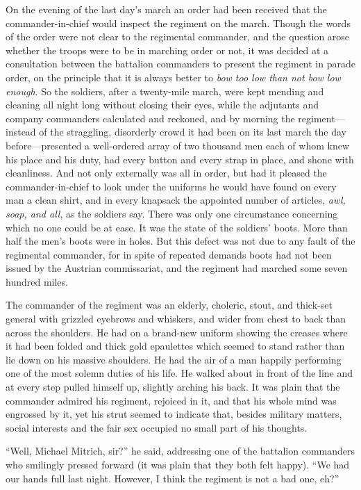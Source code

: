 On the evening of the last day's march an order had been received
that the commander-in-chief would inspect the regiment on the
march. Though the words of the order were not clear to the
regimental commander, and the question arose whether the troops
were to be in marching order or not, it was decided at a
consultation between the battalion commanders to present the
regiment in parade order, on the principle that it is always
better to \emph{bow too low than not bow low enough}. So the
soldiers, after a twenty-mile march, were kept mending and
cleaning all night long without closing their eyes, while the
adjutants and company commanders calculated and reckoned, and by
morning the regiment---instead of the straggling, disorderly
crowd it had been on its last march the day before---presented a
well-ordered array of two thousand men each of whom knew his
place and his duty, had every button and every strap in place,
and shone with cleanliness. And not only externally was all in
order, but had it pleased the commander-in-chief to look under
the uniforms he would have found on every man a clean shirt, and
in every knapsack the appointed number of articles, \emph{awl,
soap, and all}, as the soldiers say.  There was only one
circumstance concerning which no one could be at ease. It was the
state of the soldiers' boots. More than half the men's boots were
in holes. But this defect was not due to any fault of the
regimental commander, for in spite of repeated demands boots had
not been issued by the Austrian commissariat, and the regiment
had marched some seven hundred miles.

The commander of the regiment was an elderly, choleric, stout,
and thick-set general with grizzled eyebrows and whiskers, and
wider from chest to back than across the shoulders. He had on a
brand-new uniform showing the creases where it had been folded
and thick gold epaulettes which seemed to stand rather than lie
down on his massive shoulders. He had the air of a man happily
performing one of the most solemn duties of his life. He walked
about in front of the line and at every step pulled himself up,
slightly arching his back. It was plain that the commander
admired his regiment, rejoiced in it, and that his whole mind was
engrossed by it, yet his strut seemed to indicate that, besides
military matters, social interests and the fair sex occupied no
small part of his thoughts.

``Well, Michael Mitrich, sir?'' he said, addressing one of the
battalion commanders who smilingly pressed forward (it was plain
that they both felt happy). ``We had our hands full last
night. However, I think the regiment is not a bad one, eh?''

